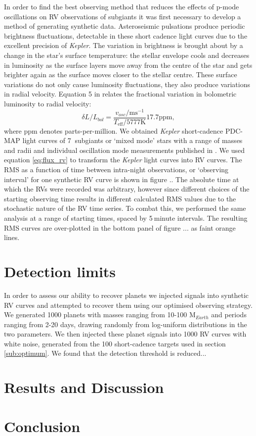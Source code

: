 \documentclass[useAMS, usenatbib]{aastex}
\newcommand{\integer}{5}
\newcommand{\nsubs}{7}
\begin{document}
In order to find the best observing method that reduces the effects of p-mode
oscillations on RV observations of subgiants it was first necessary to develop
a method of generating synthetic data.
Asteroseismic pulsations produce periodic brightness fluctuations, detectable
in these short cadence light curves due to the excellent precision of
{\it Kepler}.
The variation in brightness is brought about by a change in the star's surface
temperature: the stellar envelope cools and decreases in luminosity as the
surface layers move away from the centre of the star and gets brighter again
as the surface moves closer to the stellar centre.
These surface variations do not only cause luminosity fluctuations, they also
produce variations in radial velocity.
Equation 5 in \citet{Kjeldsen1995} relates the fractional variation in
bolometric luminosity to radial velocity:
\begin{equation}
	\delta L/L_{bol} = \frac{v_{osc}/\mathrm{ms}^{-1}}
	{T_{\mathrm{eff}}/5777\mathrm{K}}17.7\mathrm{ppm},
\end{equation}
\label{eq:flux_rv}
where ppm denotes parts-per-million.
We obtained {\it Kepler} short-cadence PDC-MAP light curves
\citep[][]{Smith2012, Stumpe2012} of \nsubs$~$ subgiants or `mixed mode' stars
with a range of masses and radii and individual oscillation mode measurements
published in \citet{Appourchaux2012}.
We used equation \ref{eq:flux_rv} to transform the {\it Kepler} light curves
into RV curves.
The RMS as a function of time between intra-night observations, or
`observing interval' for one synthetic RV curve is shown in figure ..
The absolute time at which the RVs were recorded was arbitrary, however since
different choices of the starting observing time results in different
calculated RMS values due to the stochastic nature of the RV time series.
To combat this, we performed the same analysis at a range of
starting times, spaced by \integer$~$minute intervals.
The resulting RMS curves are over-plotted in the bottom panel of figure ...
as faint orange lines.

\section{Detection limits}
\label{section:detection}

In order to assess our ability to recover planets we injected signals into
synthetic RV curves and attempted to recover them using our optimised observing
strategy.
We generated 1000 planets with masses ranging from 10-100 M$_{Earth}$ and
periods ranging from 2-20 days, drawing randomly from log-uniform
distributions in the two parameters.
We then injected these planet signals into 1000 RV curves with white noise,
generated from the 100 short-cadence targets used in section \ref{sub:optimum}.
We found that the detection threshold is reduced...

\section{Results and Discussion}
\label{results}

\section{Conclusion}
\label{conclusion}



\end{document}
